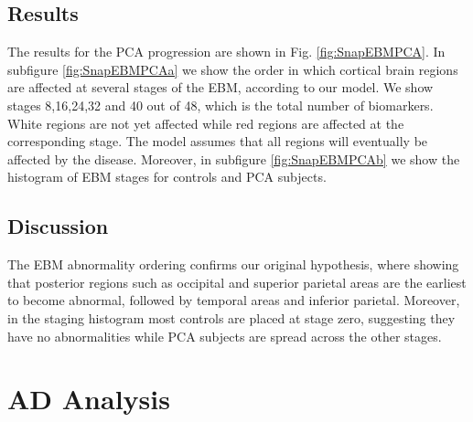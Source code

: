 \subsection{Results}
 
The results for the PCA progression are shown in Fig. \ref{fig:SnapEBMPCA}. In subfigure \ref{fig:SnapEBMPCAa} we show the order in which cortical brain regions are affected at several stages of the EBM, according to our model. We show stages 8,16,24,32 and 40 out of 48, which is the total number of biomarkers. White regions are not yet affected while red regions are affected at the corresponding stage. The model assumes that all regions will eventually be affected by the disease. Moreover, in subfigure \ref{fig:SnapEBMPCAb} we show the histogram of EBM stages for controls and PCA subjects. 

\newcommand*{\scaleBrainImg}{0.3}

\newcommand*{\snapLocationPCA}{images/ebm/mriAllGaussUnifDirPCA/snapshots} %
\newcommand*{\captionSnapEBMPCA}{\caption{(a) Timing of atrophy in PCA subjects according to the Event-based Model. White regions have not been affected, while red regions have been affected by the corresponding stage. (b) The histogram of EBM stages for controls and PCA subjects.}\label{fig:SnapEBMPCA}}


\subsection{Discussion}

The EBM abnormality ordering confirms our original hypothesis, where showing that posterior regions such as occipital and superior parietal areas are the earliest to become abnormal, followed by temporal areas and inferior parietal. Moreover, in the staging histogram most controls are placed at stage zero, suggesting they have no abnormalities while PCA subjects are spread across the other stages. 

\section{AD Analysis}
\label{ebm:ad}


